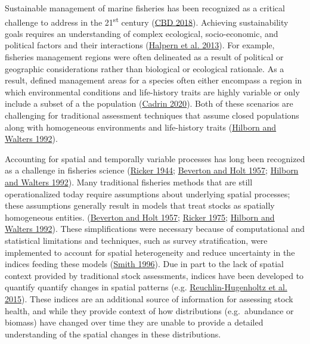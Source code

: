 \documentclass[
]{article}
\begin{document}
Sustainable management of marine fisheries has been recognized as a critical challenge to address in the 21\textsuperscript{st} century (\protect\hyperlink{ref-cbdAichiBiodiversityTargets2018}{CBD 2018}). Achieving sustainability goals requires an understanding of complex ecological, socio-economic, and political factors and their interactions (\protect\hyperlink{ref-halpernAchievingTripleBottom2013}{Halpern et al. 2013}). For example, fisheries management regions were often delineated as a result of political or geographic considerations rather than biological or ecological rationale. As a result, defined management areas for a species often either encompass a region in which environmental conditions and life-history traits are highly variable or only include a subset of a the population (\protect\hyperlink{ref-cadrinDefiningSpatialStructure2020a}{Cadrin 2020}). Both of these scenarios are challenging for traditional assessment techniques that assume closed populations along with homogeneous environments and life-history traits (\protect\hyperlink{ref-hilbornQuantitativeFisheriesStock1992}{Hilborn and Walters 1992}).

Accounting for spatial and temporally variable processes has long been recognized as a challenge in fisheries science (\protect\hyperlink{ref-rickerFurtherNotesFishing1944}{Ricker 1944}; \protect\hyperlink{ref-bevertonDynamicsExploitedFish1957}{Beverton and Holt 1957}; \protect\hyperlink{ref-hilbornQuantitativeFisheriesStock1992}{Hilborn and Walters 1992}). Many traditional fisheries methods that are still operationalized today require assumptions about underlying spatial processes; these assumptions generally result in models that treat stocks as spatially homogeneous entities. (\protect\hyperlink{ref-bevertonDynamicsExploitedFish1957}{Beverton and Holt 1957}; \protect\hyperlink{ref-rickerComputationInterpretationBiological1975}{Ricker 1975}; \protect\hyperlink{ref-hilbornQuantitativeFisheriesStock1992}{Hilborn and Walters 1992}). These simplifications were necessary because of computational and statistical limitations and techniques, such as survey stratification, were implemented to account for spatial heterogeneity and reduce uncertainty in the indices feeding these models (\protect\hyperlink{ref-smithAnalysisDataBottom1996}{Smith 1996}). Due in part to the lack of spatial context provided by traditional stock assessments, indices have been developed to quantify quantify changes in spatial patterns (e.g. \protect\hyperlink{ref-reuchlin-hugenholtzPotentialSpatialDistribution2015}{Reuchlin-Hugenholtz et al. 2015}). These indices are an additional source of information for assessing stock health, and while they provide context of how distributions (e.g.~abundance or biomass) have changed over time they are unable to provide a detailed understanding of the spatial changes in these distributions.
\end{document}
